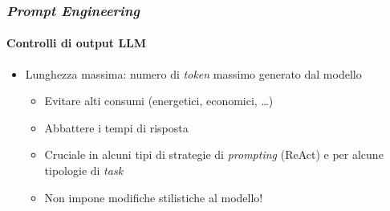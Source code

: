 %
\begin{frame}[t] \frametitle{\emph{Prompt Engineering}}
\framesubtitle{Controlli di output LLM}
{\small
    \begin{minipage}[t]{\textwidth}
        \begin{itemize}[leftmargin=10pt,align=right]
            \item[\alertedcircled{1}] \alert{Lunghezza massima:} numero di \emph{token} massimo generato dal modello
            \begin{itemize}[leftmargin=10pt,align=right]
                \item[\alert{\faArrowCircleRight}] Evitare alti consumi (energetici, economici, \ldots)
                \item[\alert{\faArrowCircleRight}] Abbattere i tempi di risposta
                \item[\alert{\faArrowCircleRight}] Cruciale in alcuni tipi di strategie di \textit{prompting} (ReAct) e per alcune tipologie di \textit{task}
                \item[\alert{\faExclamationTriangle}] \alert{Non} impone modifiche stilistiche al modello!
            \end{itemize}
        \end{itemize}
    \end{minipage}
}
\end{frame}
%
